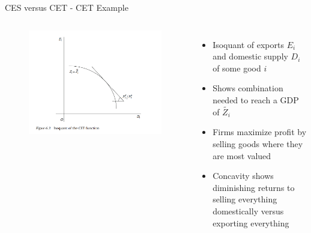 \documentclass[11pt,aspectratio=169]{beamer}
\begin{document}
\begin{frame}{CES versus CET - CET Example}

\begin{columns}[T,onlytextwidth]
	
	
	\begin{figure}
		\hspace{-2em}
		\vspace{1em}
		\includegraphics[width=1\textwidth]{exhibits/CET_example.PNG} 
	\end{figure}
	
	
	\begin{itemize}
		
		\setlength\itemsep{1.5em}
		
		\item Isoquant of exports $E_i$ and domestic supply $D_i$ of some good $i$
		
		\item Shows combination needed to reach a GDP of $\tilde{Z_i}$
		
		\item Firms maximize profit by selling goods where they are most valued
		
		\item Concavity shows diminishing returns to selling everything domestically versus exporting everything
		
	\end{itemize}
	
\end{columns}

\end{frame}
\end{document}
